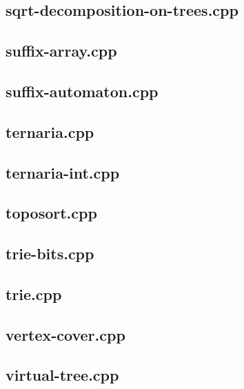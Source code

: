 \documentclass[a4paper,12pt]{article}
\begin{document}
\subsection{sqrt-decomposition-on-trees.cpp}


\subsection{suffix-array.cpp}


\subsection{suffix-automaton.cpp}


\subsection{ternaria.cpp}


\subsection{ternaria-int.cpp}


\subsection{toposort.cpp}


\subsection{trie-bits.cpp}


\subsection{trie.cpp}


\subsection{vertex-cover.cpp}


\subsection{virtual-tree.cpp}

\end{document}
